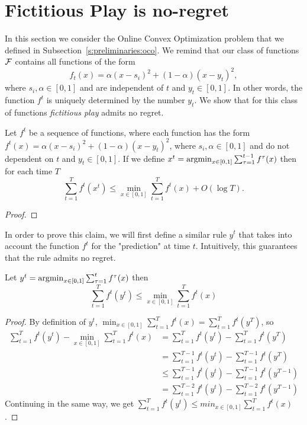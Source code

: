 \section{Fictitious Play is no-regret}\label{s:fictitious_noregret}

In this section we consider the Online Convex Optimization problem
that we defined in Subsection~\ref{s:preliminaries:oco}. We remind that
our class of functions $\mathcal{F}$ contains all functions of the form
\[
  f_t(x) = \alpha(x-s_i)^2 + (1-\alpha)(x-y_t)^2,
\]
where $s_i,\alpha \in [0,1]$ and are independent of $t$ and $y_t \in [0,1]$.
In other words, the function $f^t$ is uniquely determined by the number $y_t$.
We show that for this class of functions \emph{fictitious play} admits no regret.
\begin{theorem}\label{t:no_regret}
  Let $f^t$ be a sequence of functions, where each function has the form
  $f^t(x) = \alpha(x-s_i)^2 + (1-\alpha)(x-y_t)^2$,
  where $s_i,\alpha \in [0,1]$ and do not dependent on $t$
  and $y_t \in [0,1]$.
  If we define \(x^t = \operatorname*{argmin}_{x \in [0,1]} \sum_{\tau = 1}^{t-1} f^\tau (x) \)
  then for each time $T$
  \[
    \sum_{t = 1}^{T} f^t(x^t) \leq
    \min_{x \in [0,1]} \sum_{t=1}^T f^t(x) + O(\log  T).
  \]
\end{theorem}
\begin{proof}
\end{proof}

In order to prove this claim, we will first define a similar rule $y^t$
that takes into account the function $f^t$ for the "prediction" at time $t$.
Intuitively, this guarantees that the rule admits no regret.

\begin{lemma}
  Let
  \(y^t = \operatorname*{argmin}_{x \in [0,1]} \sum_{\tau = 1}^t f^\tau (x)\)
  then
  \[
    \sum_{t=1}^T f^t(y^t) \leq \min_{x \in [0,1]} \sum_{t=1}^T f^t(x)
  \]
\end{lemma}

\begin{proof}By definition of $y^t$,
  $\min_{x \in [0,1]} \sum_{t=1}^T f^t(x) = \sum_{t=1}^T f^t(y^T)$, so
  \begin{align*}
    \sum_{t=1}^T f^t(y^t) - \min_{x \in [0,1]} \sum_{t=1}^T f^t(x) &=
    \sum_{t=1}^T f^t(y^t) - \sum_{t=1}^T f^t(y^T)\\
    &= \sum_{t=1}^{T-1} f^t(y^t) - \sum_{t=1}^{T-1} f^t(y^T)\\
    &\leq \sum_{t=1}^{T-1} f^t(y^t) - \sum_{t=1}^{T-1} f^t(y^{T-1})\\
    &= \sum_{t=1}^{T-2} f^t(y^t) - \sum_{t=1}^{T-2} f^t(y^{T-1})
  \end{align*}
  Continuing in the same way, we get
  $\sum_{t=1}^T f^t(y^t) \leq min_{x \in [0,1]} \sum_{t=1}^T f^t(x)$.
\end{proof}

